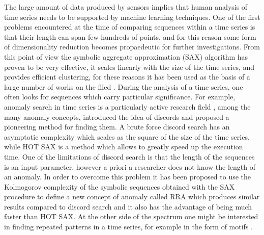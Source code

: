 \documentclass[a4paper,twoside]{article}
\begin{document}

The large amount of data produced by sensors implies that human analysis of time series needs to be supported by machine learning techniques.
One of the first problems encountered at the time of comparing sequences within a time series is that their length can span few hundreds of points, and for this reason some form of dimensionality reduction becomes propaedeutic for further investigations. From this point of view the symbolic aggregate approximation (SAX) algorithm \cite{sax}  has proven to be very effective, it scales linearly with the size of the time series, and provides efficient clustering, for these reasons it has been used as the basis of a large number of works on the filed \cite{sax_spawns}.
%
During the analysis of a time series, one often looks for sequences which carry particular significance. For example,
anomaly search in time series is a particularly active research field \cite{Chandola}, among the many anomaly concepts, \cite{hotsax} introduced the idea of discords and proposed a pioneering method for finding them. A brute force discord search has an asymptotic complexity which scales as the square of the size of the time series, while HOT SAX \cite{hotsax} is a method which allows to greatly speed up the execution time. One of the limitations of discord search is that the length of the sequences is an input parameter, however a priori a researcher does not know the length of an anomaly. In order to overcome this problem it has been proposed to use the Kolmogorov complexity of the symbolic sequences obtained with the SAX procedure to define a new concept of anomaly called RRA which  produces similar results compared to discord search \cite{grammarviz2} \cite{senin} and it also has the advantage of being much faster than HOT SAX.  At the other side of the spectrum one might be interested in finding repeated patterns in a time series, for example in the form of motifs \cite{motifs0}  \cite{motifs} \cite{motifs2}.
\end{document}
